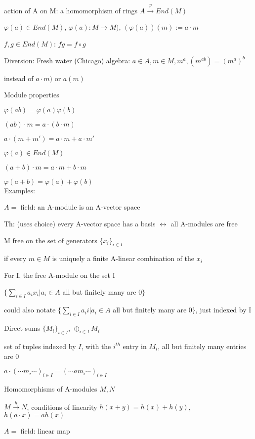 \documentclass[12pt]{article}
\begin{document}
action of A on M: a homomorphism of rings $A \xrightarrow{\varphi} End(M)$

$\varphi(a) \in End(M)$, $\varphi(a): M \to M)$, $(\varphi(a))(m) := a \cdot m$

$f, g \in End(M)$: $fg = f \circ g$

\noindent
Diversion: Fresh water (Chicago) algebra: $a \in A, m \in M, m^a, (m^{ab}) = (m^a)^b$

instead of $a \cdot m)$ or $a(m)$

\noindent
Module properties

$\varphi(ab) = \varphi(a)\varphi(b)$

$(ab) \cdot m = a \cdot (b \cdot m)$

$a \cdot (m + m') = a \cdot m + a \cdot m'$

$\varphi(a) \in End(M)$

$(a + b) \cdot m = a \cdot m + b \cdot m$

$\varphi(a + b) = \varphi(a) + \varphi(b)$\\

\noindent
Examples:

$A =$ field: an A-module is an A-vector space

Th: (uses choice) every A-vector space has a basis $\leftrightarrow$ all A-modules are free

\noindent
M free on the set of generators $\{x_i\}_{i \in I}$

if every $m \in M$ is uniquely a finite A-linear combination of the $x_i$

\noindent
For I, the free A-module on the set I

$\{\sum_{i \in I}a_ix_i | a_i \in A$ all but finitely many are 0$\}$

could also notate $\{\sum_{i \in I}a_ii | a_i \in A$ all but finitely many are 0$\}$, just indexed by I

\noindent
Direct sums $\{M_i\}_{i \in I}$, $\oplus_{i \in I}M_i$

set of tuples indexed by $I$, with the $i^{th}$ entry in $M_i$, all but finitely many entries are 0

$a \cdot (\cdots m_i \cdots)_{i \in I} = (\cdots am_i \cdots)_{i \in I}$

\noindent
Homomorphisms of A-modules $M, N$

$M \xrightarrow{h} N$, conditions of linearity $h(x + y) = h(x) + h(y)$, $h(a \cdot x) = a h(x)$

$A =$ field: linear map
\end{document}
